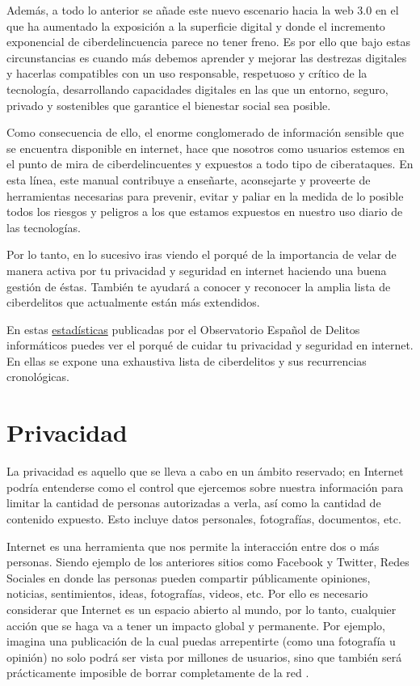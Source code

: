 \documentclass[
  a4paper,
  openany]{book}
\begin{document}
Además, a todo lo anterior se añade este nuevo escenario hacia la web 3.0 en el que ha aumentado la exposición a la superficie digital y donde el incremento exponencial de ciberdelincuencia parece no tener freno. Es por ello que bajo estas circunstancias es cuando más debemos aprender y mejorar las destrezas digitales y hacerlas compatibles con un uso responsable, respetuoso y crítico de la tecnología, desarrollando capacidades digitales en las que un entorno, seguro, privado y sostenibles que garantice el bienestar social sea posible.

Como consecuencia de ello, el enorme conglomerado de información sensible que se encuentra disponible en internet, hace que nosotros como usuarios estemos en el punto de mira de ciberdelincuentes y expuestos a todo tipo de ciberataques. En esta línea, este manual contribuye a enseñarte, aconsejarte y proveerte de herramientas necesarias para prevenir, evitar y paliar en la medida de lo posible todos los riesgos y peligros a los que estamos expuestos en nuestro uso diario de las tecnologías.

Por lo tanto, en lo sucesivo iras viendo el porqué de la importancia de velar de manera activa por tu privacidad y seguridad en internet haciendo una buena gestión de éstas. También te ayudará a conocer y reconocer la amplia lista de ciberdelitos que actualmente están más extendidos.

En estas \href{https://oedi.es/estadisticas/}{estadísticas} publicadas por el Observatorio Español de Delitos informáticos \citep{oedi} puedes ver el porqué de cuidar tu privacidad y seguridad en internet. En ellas se expone una exhaustiva lista de ciberdelitos y sus recurrencias cronológicas.

\hypertarget{privacidad}{%
\section{Privacidad}\label{privacidad}}

La privacidad es aquello que se lleva a cabo en un ámbito reservado; en Internet podría entenderse como el control que ejercemos sobre nuestra información para limitar la cantidad de personas autorizadas a verla, así como la cantidad de contenido expuesto. Esto incluye datos personales, fotografías, documentos, etc.

Internet es una herramienta que nos permite la interacción entre dos o más personas. Siendo ejemplo de los anteriores sitios como Facebook y Twitter, Redes Sociales en donde las personas pueden compartir públicamente opiniones, noticias, sentimientos, ideas, fotografías, videos, etc. Por ello es necesario considerar que Internet es un espacio abierto al mundo, por lo tanto, cualquier acción que se haga va a tener un impacto global y permanente. Por ejemplo, imagina una publicación de la cual puedas arrepentirte (como una fotografía u opinión) no solo podrá ser vista por millones de usuarios, sino que también será prácticamente imposible de borrar completamente de la red .
\end{document}
